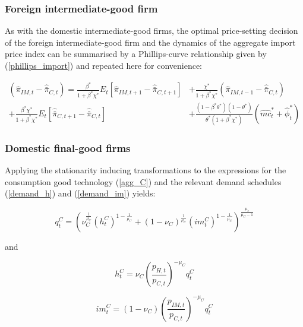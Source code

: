\documentclass[a4paper,11pt]{article}
\numberwithin{equation}{section}
\begin{document}
	\subsubsection{Foreign intermediate-good firm}	 
	
	As with the domestic intermediate-good firms, the optimal price-setting decision of the foreign intermediate-good firm and the dynamics of the aggregate import price index can be summarised by a Phillips-curve relationship given by (\ref{phillips_import}) and repeated here for convenience:
	
	\begin{equation} \label{a_philim}
	\begin{split}
	\left(\hat{\pi}_{IM,t}-\hat{\bar{\pi}}_{C,t}\right)=\frac{\beta^*}{1+\beta^*\chi^*}E_t\left[\hat{\pi}_{IM,t+1}-\hat{\bar{\pi}}_{C,t+1}\right]& +\frac{\chi^*}{1+\beta^*\chi^*}\left(\hat{\pi}_{IM,t-1}-\hat{\bar{\pi}}_{C,t}\right)  \\ +\frac{\beta^*\chi^*}{1+\beta^*\chi^*}E_t\left[\hat{\bar{\pi}}_{C,t+1}-\hat{\bar{\pi}}_{C,t}\right]&+\frac{\left(1-\beta^*\theta^*\right)\left(1-\theta^*\right)}{\theta^*\left(1+\beta^*\chi^*\right)}\left(\widehat{mc}^*_t+\hat{\phi}^*_t\right)
	\end{split}
	\end{equation}
	
	\subsubsection{Domestic final-good firms}
	
	Applying the stationarity inducing transformations to the expressions for the consumption good technology (\ref{agg_C}) and the relevant demand schedules (\ref{demand_h}) and (\ref{demand_im}) yields:
	
	\begin{equation}
	q_t^C=\left(\nu_{C}^{\frac{1}{\mu_C}}\left(h_t^C\right)^{1-\frac{1}{\mu_C}}+(1-\nu_C)^{\frac{1}{\mu_C}}\left(im_t^C\right)^{1-\frac{1}{\mu_C}}\right)^{\frac{\mu_c}{\mu_C-1}}
	\end{equation}
	
	and
	
	\begin{equation}
	h_t^C=\nu_C\left(\frac{p_{H,t}}{p_{C,t}}\right)^{-\mu_C}q_t^C
	\end{equation}
	
	\begin{equation}
	im_t^C=(1-\nu_C)\left(\frac{p_{IM,t}}{p_{C,t}}\right)^{-\mu_C}q_t^C
	\end{equation}
	
\end{document}
